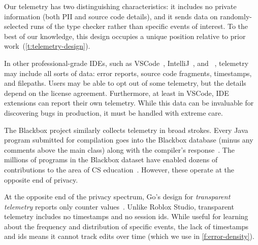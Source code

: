 \documentclass[english,submission,cleveref]{programming}
\begin{document}
Our telemetry has two distinguishing characteristics:
it includes no private information (both PII and source code details),
and it sends data on
randomly-selected runs of the type checker rather than specific events of interest.
To the best of our knowledge, this design occupies a unique position relative to prior
work~(\cref{t:telemetry-design}).

In other professional-grade IDEs, such as VSCode~\cite{vscode-telemetry},
IntelliJ~\cite{intellij-telemetry}, and ~\cite{dotnet-telemetry}, telemetry may include all sorts of
data: error reports, source code fragments, time\-stamps, and filepaths.
Users may be able to opt out of some telemetry, but the details depend on the
license agreement.
Furthermore, at least in VSCode, IDE extensions can report their own telemetry.
While this data can be invaluable for discovering bugs in production, it
must be handled with extreme care.

The Blackbox project similarly collects telemetry in broad strokes.
Every Java program submitted for compilation goes into the Blackbox database (minus
any comments above the main class) along with the compiler's response~\cite{bkmu-sigcse-2014}.
The millions of programs in the Blackbox dataset
have enabled dozens of contributions to the area of CS
education~\cite{bask-icer-2018}. However, these operate at the
opposite end of privacy.


At the opposite end of the privacy spectrum, Go's design for \emph{transparent
telemetry} reports only counter values~\cite{transparent-telemetry}.
Unlike Roblox Studio, transparent telemetry includes no timestamps and no 
session ids.
While useful for learning about the frequency and distribution of
specific events, the lack of timestamps and ids means it cannot track
edits over time (which we use in \cref{f:error-density}).
\end{document}
